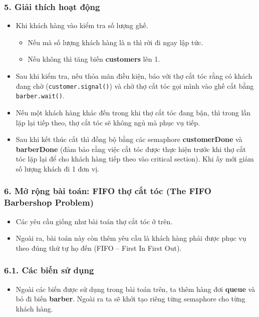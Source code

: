\subsubsection*{5. Giải thích hoạt động}
\begin{itemize}
    \item Khi khách hàng vào kiểm tra số lượng ghế.
    \begin{itemize}
        \item Nếu mà số lượng khách hàng là n thì rời đi ngay lập tức.
        \item  Nếu không thì tăng biến \textbf{customers} lên 1.
    \end{itemize}
    \item Sau khi kiểm tra, nếu thỏa mãn điều kiện, báo với thợ cắt tóc rằng có khách đang chờ (\texttt{customer.signal()}) và chờ thợ cắt tóc gọi mình vào ghế cắt bằng \texttt{barber.wait()}.
    \item Nếu một khách hàng khác đến trong khi thợ cắt tóc đang bận, thì trong lần lặp lại tiếp theo, thợ cắt tóc sẽ không ngủ mà phục vụ tiếp.
    \item Sau khi kết thúc cắt thì đồng bộ bằng các semaphore \textbf{customerDone} và \textbf{barberDone} (đảm bảo rằng việc cắt tóc được thực hiện trước khi thợ cắt tóc lặp lại để cho khách hàng tiếp theo vào  critical section). Khi ấy mới giảm số lượng khách đi 1 đơn vị.
\end{itemize}
\subsubsection*{6. Mở rộng bài toán: FIFO thợ cắt tóc (The FIFO Barbershop Problem)}
\begin{itemize}
    \item Các yêu cầu giống như bài toán thợ cắt tóc ở trên.
    \item Ngoài ra, bài toán này còn thêm yêu cầu là khách hàng phải được phục vụ theo đúng thứ tự họ đến (FIFO – First In First Out).
\end{itemize}
\subsubsection*{6.1. Các biến sử dụng}
\begin{itemize}
    \item Ngoài các biến được sử dụng trong bài toán trên, ta thêm hàng đơi \textbf{queue} và bỏ đi biến \textbf{barber}. Ngoài ra ta sẽ khởi tạo riêng từng semaphore cho từng khách hàng.
\end{itemize}
